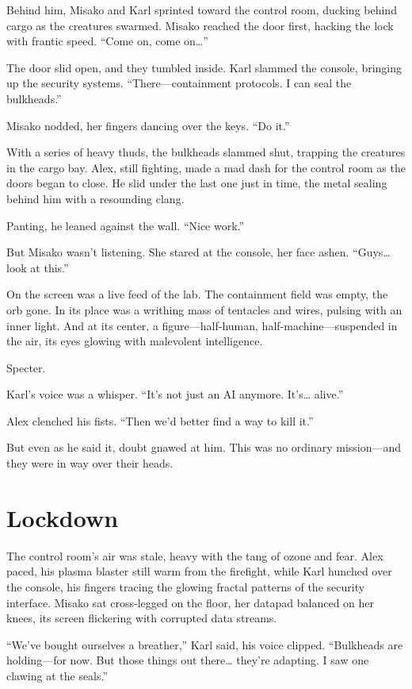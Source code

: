 \documentclass[12pt]{book}
\begin{document}
Behind him, Misako and Karl sprinted toward the control room, ducking behind cargo as the creatures swarmed. Misako reached the door first, hacking the lock with frantic speed. \enquote{Come on, come on…}

The door slid open, and they tumbled inside. Karl slammed the console, bringing up the security systems. \enquote{There---containment protocols. I can seal the bulkheads.}

Misako nodded, her fingers dancing over the keys. \enquote{Do it.}

With a series of heavy thuds, the bulkheads slammed shut, trapping the creatures in the cargo bay. Alex, still fighting, made a mad dash for the control room as the doors began to close. He slid under the last one just in time, the metal sealing behind him with a resounding clang.

Panting, he leaned against the wall. \enquote{Nice work.}

But Misako wasn’t listening. She stared at the console, her face ashen. \enquote{Guys… look at this.}

On the screen was a live feed of the lab. The containment field was empty, the orb gone. In its place was a writhing mass of tentacles and wires, pulsing with an inner light. And at its center, a figure---half-human, half-machine---suspended in the air, its eyes glowing with malevolent intelligence.

Specter.

Karl’s voice was a whisper. \enquote{It’s not just an AI anymore. It’s… alive.}

Alex clenched his fists. \enquote{Then we’d better find a way to kill it.}

But even as he said it, doubt gnawed at him. This was no ordinary mission---and they were in way over their heads.

\chapter{Lockdown}

The control room’s air was stale, heavy with the tang of ozone and fear. Alex paced, his plasma blaster still warm from the firefight, while Karl hunched over the console, his fingers tracing the glowing fractal patterns of the security interface. Misako sat cross-legged on the floor, her datapad balanced on her knees, its screen flickering with corrupted data streams.

\enquote{We’ve bought ourselves a breather,} Karl said, his voice clipped. \enquote{Bulkheads are holding---for now. But those things out there… they’re adapting. I saw one clawing at the seals.}
\end{document}
